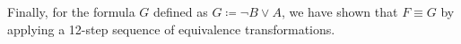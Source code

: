 \documentclass[unicode,11pt,a4paper,oneside,numbers=endperiod,openany]{scrartcl}
\begin{document}
Finally, for the formula \( G \) defined as \( G \coloneq \neg B \lor A \),
we have shown that \( F \equiv G \) by applying a 12-step sequence of equivalence transformations.












\end{document}
